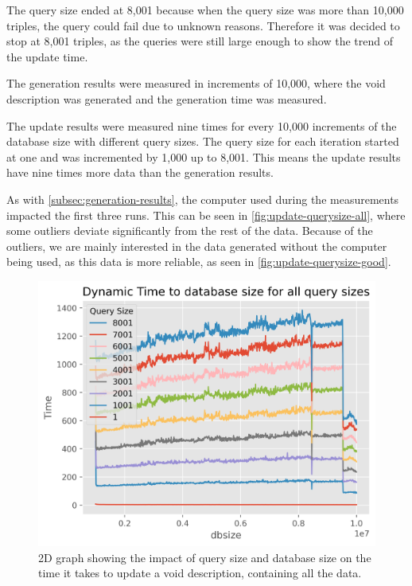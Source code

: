 The query size ended at 8,001 because when the query size was more than 10,000 triples, the query could fail due to unknown reasons. Therefore it was decided to stop at 8,001 triples, as the queries were still large enough to show the trend of the update time.

The generation results were measured in increments of 10,000, where the \gls{void} description was generated and the generation time was measured.

The update results were measured nine times for every 10,000 increments of the database size with different query sizes. The query size for each iteration started at one and was incremented by 1,000 up to 8,001. This means the update results have nine times more data than the generation results.

As with \autoref{subsec:generation-results}, the computer used during the measurements impacted the first three runs. This can be seen in \autoref{fig:update-querysize-all}, where some outliers deviate significantly from the rest of the data. Because of the outliers, we are mainly interested in the data generated without the computer being used, as this data is more reliable, as seen in \autoref{fig:update-querysize-good}.

\begin{figure}[htb!]
    \centering
    \includegraphics[width=0.8\columnwidth]{figures/dynamic-time-query-size-all.png}
    \caption{2D graph showing the impact of query size and database size on the time it takes to update a \gls{void} description, containing all the data.}
    \label{fig:update-querysize-all}
\end{figure}

